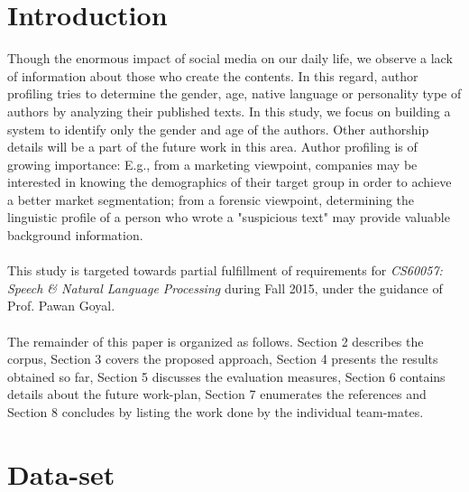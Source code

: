 \documentclass{sig-alternate}
\begin{document}
\section{Introduction}
Though the enormous impact of social media on our daily life, we observe a lack of information about those who create the contents. In this regard, author profiling tries to determine the gender, age, native language or personality type of authors by analyzing their published texts. In this study, we focus on building a system to identify only the gender and age of the authors. Other authorship details will be a part of the future work in this area. Author profiling is of growing importance: E.g., from a marketing viewpoint, companies may be interested in knowing the demographics of their target group in order to achieve a better market segmentation; from a forensic viewpoint, determining the linguistic profile of a person who wrote a "suspicious text" may provide valuable background information.\\\\
This study is targeted towards partial fulfillment of requirements for \textit{CS60057: Speech \& Natural Language Processing} during Fall 2015, under the guidance of Prof. Pawan Goyal.\\\\
The remainder of this paper is organized as follows. Section 2 describes the corpus, Section 3 covers the proposed approach, Section 4 presents the results obtained so far, Section 5 discusses the evaluation measures, Section 6 contains details about the future work-plan, Section 7 enumerates the references and Section 8 concludes by listing the work done by the individual team-mates.
\newpage
\section{Data-set}
\end{document}
